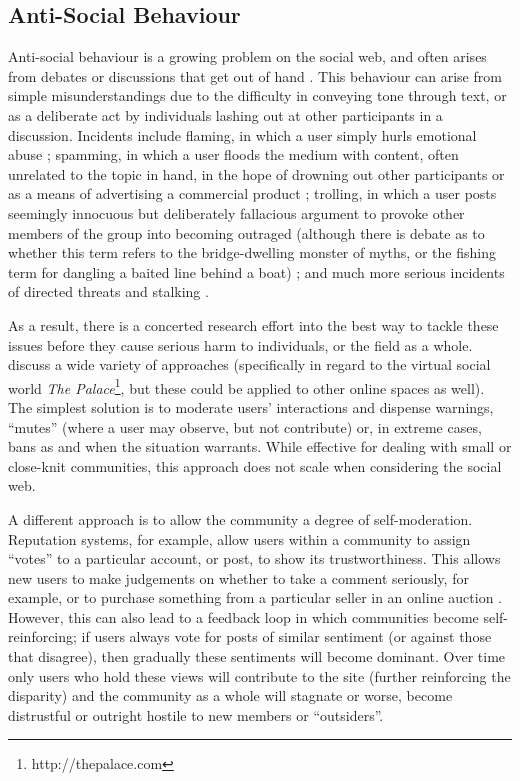\subsection{Anti-Social Behaviour}
\label{background:online:antisocial}
Anti-social behaviour is a growing problem on the social web, and often arises from debates or discussions that get out of hand \citep{suler1998bad, davis2002experience, sood2012automatic}. This behaviour can arise from simple misunderstandings due to the difficulty in conveying tone through text, or as a deliberate act by individuals lashing out at other participants in a discussion. Incidents include
flaming, in which a user simply hurls emotional abuse \citep[p.~13]{Konijn2008}; spamming, in which a user floods the medium with content, often unrelated to the topic in hand, in the hope of drowning out other participants or as a means of advertising a commercial product \citep{krause2008anti}; trolling, in which a user posts seemingly innocuous but deliberately fallacious argument to provoke other members of the group into becoming outraged (although there is debate as to whether this term refers to the bridge-dwelling monster of myths, or the fishing term for dangling a baited line behind a boat) \citep{Herring2002}; 
and much more serious incidents of directed threats and stalking \citep{spitzberg2002cyberstalking, willard2007, jane2014}.

As a result, there is a concerted research effort into the best way to tackle these issues before they cause serious harm to individuals, or the field as a whole. \citet{suler1998bad} discuss a wide variety of approaches (specifically in regard to the virtual social world \textit{The Palace}\footnote{http://thepalace.com}, but these could be applied to other online spaces as well). The simplest solution is to moderate users' interactions and dispense warnings, ``mutes'' (where a user may observe, but not contribute) or, in extreme cases, bans as and when the situation warrants. While effective for dealing with small or close-knit communities, this approach does not scale when considering the social web.

 \citep{torroni2010}

A different approach is to allow the community a degree of self-moderation. Reputation systems, for example, allow users within a community to assign ``votes'' to a particular account, or post, to show its trustworthiness. This allows new users to make judgements on whether to take a comment seriously, for example, or to purchase something from a particular seller in an online auction \citep{resnick2000reputation, anderson2012discovering}. However, this can also lead to a feedback loop in which communities become self-reinforcing; if users always vote for posts of similar sentiment (or against those that disagree), then gradually these sentiments will become dominant. Over time only users who hold these views will contribute to the site (further reinforcing the disparity) and the community as a whole will stagnate or worse, become distrustful or outright hostile to new members or ``outsiders''.


